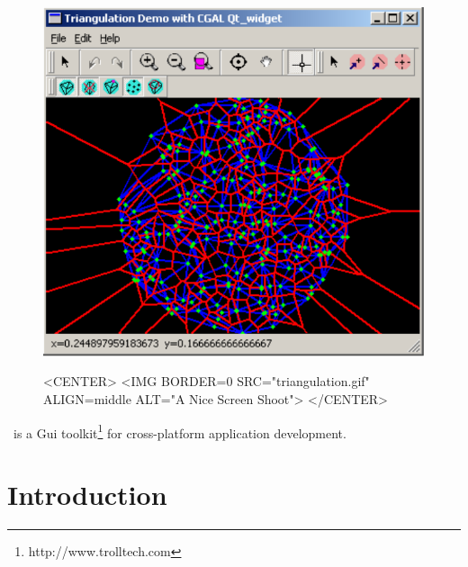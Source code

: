 


\gdef\lciIfHtmlClassLinks{\lcFalse}
\gdef\lciIfHtmlRefLinks{\lcFalse}
\gdef\lciIfHtmlLinks{\lcFalse}


\begin{figure}[h]
\begin{ccTexOnly}
\begin{center}
\includegraphics{Qt_widget/triangulation} 
\end{center}
\end{ccTexOnly}
\begin{ccHtmlOnly}
<CENTER>
<IMG BORDER=0 SRC="triangulation.gif"  ALIGN=middle  ALT="A Nice Screen Shoot">
</CENTER>
\end{ccHtmlOnly}
\end{figure}

\qt\ is a {\sc Gui} toolkit\footnote{http://www.trolltech.com} for
cross-platform application development. 

\section{Introduction}

